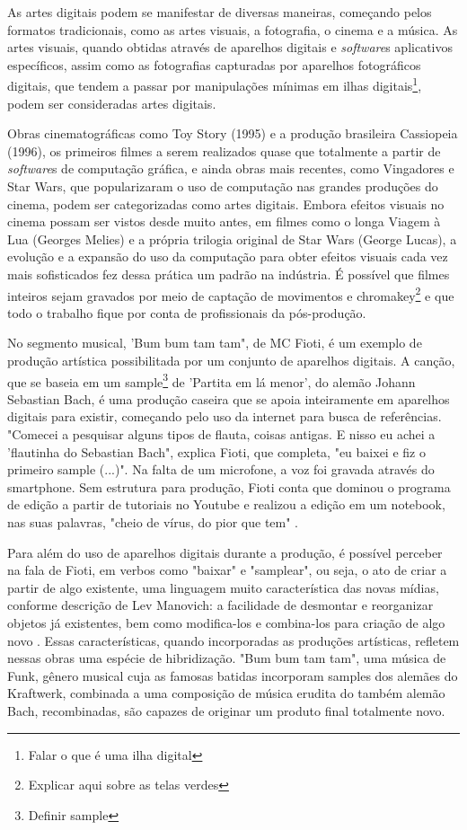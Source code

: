 As artes digitais podem se manifestar de diversas maneiras, começando  pelos formatos tradicionais, como as artes visuais, a fotografia, o cinema e a música. As artes visuais, quando obtidas através de aparelhos digitais e \textit{software}s aplicativos específicos, assim como as fotografias capturadas por aparelhos fotográficos digitais, que tendem a passar por manipulações mínimas em ilhas digitais\footnote{Falar o que é uma ilha digital}, podem ser consideradas artes digitais. 

Obras cinematográficas como Toy Story (1995) e a produção brasileira Cassiopeia (1996), os primeiros filmes a serem realizados quase que totalmente a partir de \textit{software}s de computação gráfica, e ainda obras mais recentes, como Vingadores e Star Wars, que popularizaram o uso de computação nas grandes produções do cinema, podem ser categorizadas como artes digitais. Embora efeitos visuais no cinema possam ser vistos desde muito antes, em filmes como o longa Viagem à Lua (Georges Melies) e a própria trilogia original de Star Wars (George Lucas), a evolução e a expansão do uso da computação para obter efeitos visuais cada vez mais sofisticados fez dessa prática um padrão na indústria. É possível que filmes inteiros sejam gravados por meio de captação de movimentos e chromakey\footnote{Explicar aqui sobre as telas verdes} e que todo o trabalho fique por conta de profissionais da pós-produção. 

No segmento musical, 'Bum bum tam tam", de MC Fioti, é um exemplo de produção artística possibilitada por um conjunto de aparelhos digitais. A canção, que se baseia em um sample\footnote{Definir sample} de 'Partita em lá menor', do alemão Johann Sebastian Bach, é uma produção caseira que se apoia inteiramente em aparelhos digitais para existir, começando pelo uso da internet para busca de referências. "Comecei a pesquisar alguns tipos de flauta, coisas antigas. E nisso eu achei a 'flautinha do Sebastian Bach", explica Fioti, que completa, "eu baixei e fiz o primeiro sample (...)". Na falta de um microfone, a voz foi gravada através do smartphone. Sem estrutura para produção, Fioti conta que dominou o programa de edição a partir de tutoriais no Youtube e realizou a edição em um notebook, nas suas palavras, "cheio de vírus, do pior que tem" . 

Para além do uso de aparelhos digitais durante a produção, é possível perceber na fala de Fioti, em verbos como "baixar" e "samplear", ou seja, o ato de criar a partir de algo existente, uma linguagem muito característica das novas mídias, conforme descrição de Lev Manovich: a facilidade de desmontar e reorganizar objetos já existentes, bem como modifica-los e combina-los para criação de algo novo \cite{Martino}. Essas características, quando incorporadas as produções artísticas, refletem nessas obras uma espécie de hibridização. "Bum bum tam tam", uma música de Funk, gênero musical cuja as famosas batidas incorporam samples dos alemães do Kraftwerk, combinada a uma composição de música erudita do também alemão Bach, recombinadas, são capazes de originar um produto final totalmente novo.

